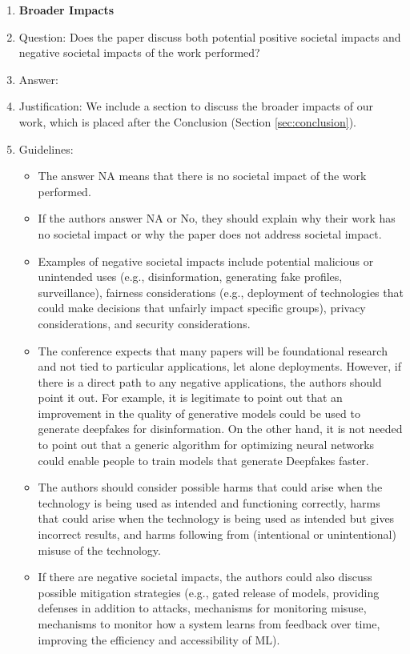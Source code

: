 \documentclass{article}
\theoremstyle{plain}
\theoremstyle{definition}
\theoremstyle{remark}
\begin{document}
\begin{enumerate}
\item {\bf Broader Impacts}
    \item[] Question: Does the paper discuss both potential positive societal impacts and negative societal impacts of the work performed?
    \item[] Answer: \answerYes{} %
    \item[] Justification: We include a section to discuss the broader impacts of our work, which is placed after the Conclusion (Section \ref{sec:conclusion}). 
    \item[] Guidelines:
    \begin{itemize}
        \item The answer NA means that there is no societal impact of the work performed.
        \item If the authors answer NA or No, they should explain why their work has no societal impact or why the paper does not address societal impact.
        \item Examples of negative societal impacts include potential malicious or unintended uses (e.g., disinformation, generating fake profiles, surveillance), fairness considerations (e.g., deployment of technologies that could make decisions that unfairly impact specific groups), privacy considerations, and security considerations.
        \item The conference expects that many papers will be foundational research and not tied to particular applications, let alone deployments. However, if there is a direct path to any negative applications, the authors should point it out. For example, it is legitimate to point out that an improvement in the quality of generative models could be used to generate deepfakes for disinformation. On the other hand, it is not needed to point out that a generic algorithm for optimizing neural networks could enable people to train models that generate Deepfakes faster.
        \item The authors should consider possible harms that could arise when the technology is being used as intended and functioning correctly, harms that could arise when the technology is being used as intended but gives incorrect results, and harms following from (intentional or unintentional) misuse of the technology.
        \item If there are negative societal impacts, the authors could also discuss possible mitigation strategies (e.g., gated release of models, providing defenses in addition to attacks, mechanisms for monitoring misuse, mechanisms to monitor how a system learns from feedback over time, improving the efficiency and accessibility of ML).
    \end{itemize}
    

\end{enumerate}
\end{document}

